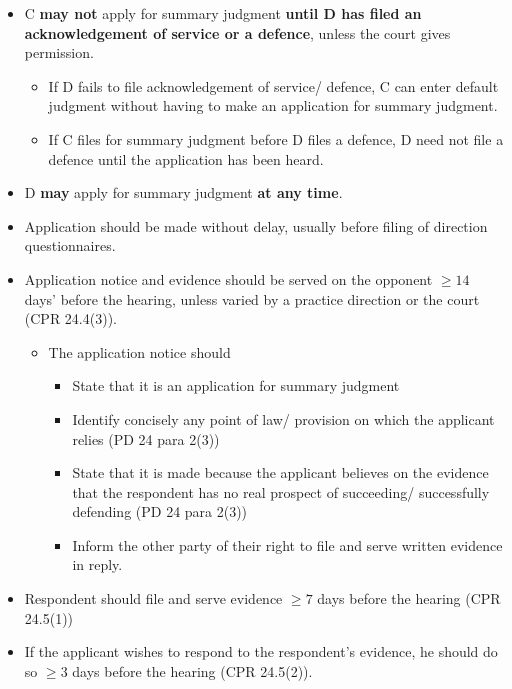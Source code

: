 \documentclass[
]{article}
\providecommand{\tightlist}{%
  \setlength{\itemsep}{0pt}\setlength{\parskip}{0pt}}
\begin{document}
\begin{itemize}
\tightlist
\item
  C \textbf{may not} apply for summary judgment \textbf{until D has
  filed an acknowledgement of service or a defence}, unless the court
  gives permission.

  \begin{itemize}
  \tightlist
  \item
    If D fails to file acknowledgement of service/ defence, C can enter
    default judgment without having to make an application for summary
    judgment.
  \item
    If C files for summary judgment before D files a defence, D need not
    file a defence until the application has been heard.
  \end{itemize}
\item
  D \textbf{may} apply for summary judgment \textbf{at any time}.
\item
  Application should be made without delay, usually before filing of
  direction questionnaires.
\item
  Application notice and evidence should be served on the opponent
  \(\geq 14\) days' before the hearing, unless varied by a practice
  direction or the court (CPR 24.4(3)).

  \begin{itemize}
  \tightlist
  \item
    The application notice should

    \begin{itemize}
    \tightlist
    \item
      State that it is an application for summary judgment
    \item
      Identify concisely any point of law/ provision on which the
      applicant relies (PD 24 para 2(3))
    \item
      State that it is made because the applicant believes on the
      evidence that the respondent has no real prospect of succeeding/
      successfully defending (PD 24 para 2(3))
    \item
      Inform the other party of their right to file and serve written
      evidence in reply.
    \end{itemize}
  \end{itemize}
\item
  Respondent should file and serve evidence \(\geq 7\) days before the
  hearing (CPR 24.5(1))
\item
  If the applicant wishes to respond to the respondent's evidence, he
  should do so \(\geq 3\) days before the hearing (CPR 24.5(2)).
\end{itemize}
\end{document}
